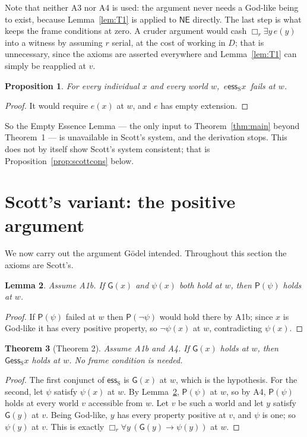 \documentclass[11pt]{article}
\theoremstyle{plain}
\newtheorem{theorem}{Theorem}
\newtheorem{lemma}[theorem]{Lemma}
\newtheorem{proposition}[theorem]{Proposition}
\theoremstyle{definition}
\newcommand{\esss}{\mathrel{\mathsf{ess}_{\mathrm{S}}}}
\newcommand{\NE}{\mathsf{NE}}
\newcommand{\Gd}{\mathsf{G}}
\newcommand{\Pos}{\mathsf{P}}
\begin{document}
\noindent
Note that neither A3 nor A4 is used: the argument never needs a God-like being
to exist, because Lemma~\ref{lem:T1} is applied to $\NE$ directly. The last
step is what keeps the frame conditions at zero. A cruder argument would cash
$\Box_r \exists y\, e(y)$ into a witness by assuming $r$ serial, at the cost of
working in $D$; that is unnecessary, since the axioms are asserted everywhere
and Lemma~\ref{lem:T1} can simply be reapplied at $v$.

\begin{proposition}\label{prop:scott}
For every individual $x$ and every world $w$, $\,e \esss x\,$ fails at $w$.
\end{proposition}

\begin{proof}
It would require $e(x)$ at $w$, and $e$ has empty extension.
\end{proof}

\noindent
So the Empty Essence Lemma --- the only input to Theorem~\ref{thm:main} beyond
Theorem~1 --- is unavailable in Scott's system, and the derivation stops. This
does not by itself show Scott's system consistent; that is
Proposition~\ref{prop:scottcons} below.

\section{Scott's variant: the positive argument}\label{sec:scott}

We now carry out the argument G\"odel intended. Throughout this section the
axioms are Scott's.

\begin{lemma}\label{lem:posgod}
Assume {\rm A1b}. If $\Gd(x)$ and $\psi(x)$ both hold at $w$, then
$\Pos(\psi)$ holds at $w$.
\end{lemma}

\begin{proof}
If $\Pos(\psi)$ failed at $w$ then $\Pos(\neg\psi)$ would hold there by A1b;
since $x$ is God-like it has every positive property, so $\neg\psi(x)$ at $w$,
contradicting $\psi(x)$.
\end{proof}

\begin{theorem}[Theorem 2]\label{thm:T2}
Assume {\rm A1b} and {\rm A4}. If $\Gd(x)$ holds at $w$, then
$\Gd \esss x$ holds at $w$. No frame condition is needed.
\end{theorem}

\begin{proof}
The first conjunct of $\esss$ is $\Gd(x)$ at $w$, which is the hypothesis. For
the second, let $\psi$ satisfy $\psi(x)$ at $w$. By Lemma~\ref{lem:posgod},
$\Pos(\psi)$ at $w$, so by A4, $\Pos(\psi)$ holds at every world $v$ accessible
from $w$. Let $v$ be such a world and let $y$ satisfy $\Gd(y)$ at $v$. Being
God-like, $y$ has every property positive at $v$, and $\psi$ is one; so
$\psi(y)$ at $v$. This is exactly
$\Box_r \forall y\,(\Gd(y) \to \psi(y))$ at $w$.
\end{proof}
\end{document}

